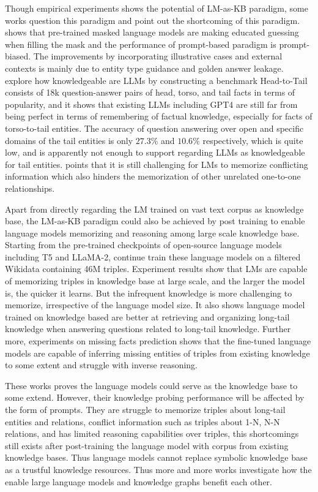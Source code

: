 Though empirical experiments shows the potential of LM-as-KB paradigm, some works question this paradigm and point out the shortcoming of this paradigm. 
\cite{llmaskb-guess} shows that pre-trained masked language models are making educated guessing when filling the mask and the performance of prompt-based paradigm is prompt-biased. The improvements by incorporating illustrative cases and external contexts is mainly due to entity type guidance and golden answer leakage. 
\cite{head-to-tail} explore how knowledgeable are LLMs by constructing a benchmark Head-to-Tail consists of 18k question-answer pairs of head, torso, and tail facts in terms of popularity, and it shows that existing LLMs including GPT4 are still far from being perfect in terms of remembering of factual knowledge, especially for facts of torso-to-tail entities. The accuracy of question answering over open and specific domains of the tail entities is only $27.3\%$ and $10.6\%$ respectively, which is quite low, and is apparently not enough to support regarding LLMs as knowledgeable for tail entities. 
\cite{lmastkg} points that it is still challenging for LMs to memorize conflicting information which also hinders the memorization of other unrelated one-to-one relationships.

Apart from directly regarding the LM trained on vast text corpus as knowledge base, the LM-as-KB paradigm could also be achieved by post training to enable language models memorizing and reasoning among large scale knowledge base. 
Starting from the pre-trained checkpoints of open-source language models including T5 and LLaMA-2, \cite{lmmemorizekb} continue train these language models on a filtered Wikidata containing 46M triples. Experiment results show that LMs are capable of memorizing triples in knowledge base at large scale, and the larger the model is, the quicker it learns. But the infrequent knowledge is more challenging to memorize, irrespective of the language model size. It also shows language model trained on knowledge based are better at retrieving and organizing long-tail knowledge when answering questions related to long-tail knowledge.  Further more, experiments on missing facts prediction shows that the fine-tuned language models are capable of inferring missing entities of triples from existing knowledge to some extent and struggle with inverse reasoning.  

These works proves the language models could serve as the knowledge base to some extend. However, their knowledge probing performance will be affected by the form of prompts. They are struggle to memorize triples about long-tail entities and relations, conflict information such as triples about 1-N, N-N relations, and has limited reasoning capabilities over triples, this shortcomings still exists after post-training the language model with corpus from existing knowledge bases. Thus language models cannot replace symbolic knowledge base as a trustful knowledge resources. Thus more and more works investigate how the enable large language models and knowledge graphs benefit each other.         

